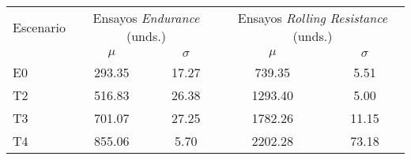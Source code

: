 \documentclass[varwidth=\maxdimen]{standalone}
\begin{document}
\begin{tabular}{ l c c c c }
	\toprule
	Escenario &
	\multicolumn{2}{c}{Ensayos \textit{Endurance} (unds.)} &
	\multicolumn{2}{c}{Ensayos \textit{Rolling Resistance} (unds.)} \\
		& $\mu$		& $\sigma$	& $\mu$		& $\sigma$ \\
	\midrule
	E0	& 293.35    & 17.27		& 739.35	& 5.51 \\
	T2	& 516.83	& 26.38		& 1293.40	& 5.00\\
	T3	& 701.07	& 27.25		& 1782.26	& 11.15 \\
	T4	& 855.06	& 5.70		& 2202.28	& 73.18 \\
	\bottomrule
\end{tabular}
\end{document}
